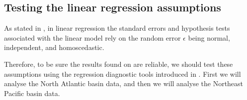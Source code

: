 \subsection{Testing the linear regression assumptions}\label{ssec:testing-assumptions}
As stated in , in linear regression the standard errors and hypothesis tests associated with the linear model rely on the random error $\epsilon$ being normal, independent, and homoscedastic.

Therefore, to be sure the results found on  are reliable, we should test these assumptions using the regression diagnostic tools introduced in . First we will analyse the North Atlantic basin data, and then we will analyse the Northeast Pacific basin data.

